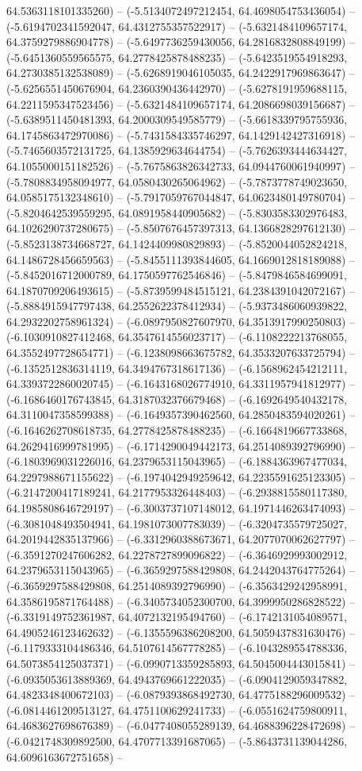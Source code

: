 64.5363118101335260) -- (-5.5134072497212454, 64.4698054753436054) -- (-5.6194702341592047, 64.4312755357522917) -- (-5.6321484109657174, 64.3759279886904778) -- (-5.6497736259430056, 64.2816832808849199) -- (-5.6451360559565575, 64.2778425878488235) -- (-5.6423519554918293, 64.2730385132538089) -- (-5.6268919046105035, 64.2422917969863647) -- (-5.6256551450676904, 64.2360390436442970) -- (-5.6278191959688115, 64.2211595347523456) -- (-5.6321484109657174, 64.2086698039156687) -- (-5.6389511450481393, 64.2000309549585779) -- (-5.6618339795755936, 64.1745863472970086) -- (-5.7431584335746297, 64.1429142427316918) -- (-5.7465603572131725, 64.1385929634644754) -- (-5.7626393444634427, 64.1055000151182526) -- (-5.7675863826342733, 64.0944760061940997) -- (-5.7808834958094977, 64.0580430265064962) -- (-5.7873778749023650, 64.0585175132348610) -- (-5.7917059767044847, 64.0623480149780704) -- (-5.8204642539559295, 64.0891958440905682) -- (-5.8303583302976483, 64.1026290737280675) -- (-5.8507676457397313, 64.1366828297612130) -- (-5.8523138734668727, 64.1424409980829893) -- (-5.8520044052824218, 64.1486728456659563) -- (-5.8455111393844605, 64.1669012818189088) -- (-5.8452016712000789, 64.1750597762546846) -- (-5.8479846584699091, 64.1870709206493615) -- (-5.8739599484515121, 64.2384391042072167) -- (-5.8884915947797438, 64.2552622378412934) -- (-5.9373486060939822, 64.2932202758961324) -- (-6.0897950827607970, 64.3513917990250803) -- (-6.1030910827412468, 64.3547614556023717) -- (-6.1108222213768055, 64.3552497728654771) -- (-6.1238098663675782, 64.3533207633725794) -- (-6.1352512836314119, 64.3494767318617136) -- (-6.1568962454212111, 64.3393722860020745) -- (-6.1643168026774910, 64.3311957941812977) -- (-6.1686460176743845, 64.3187032376679468) -- (-6.1692649540432178, 64.3110047358599388) -- (-6.1649357390462560, 64.2850483594020261) -- (-6.1646262708618735, 64.2778425878488235) -- (-6.1664819667733868, 64.2629416999781995) -- (-6.1714290049442173, 64.2514089392796990) -- (-6.1803969031226016, 64.2379653115043965) -- (-6.1884363967477034, 64.2297988671155622) -- (-6.1974042949259642, 64.2235591625123305) -- (-6.2147200417189241, 64.2177953326448403) -- (-6.2938815580117380, 64.1985808646729197) -- (-6.3003737107148012, 64.1971446263474093) -- (-6.3081048493504941, 64.1981073007783039) -- (-6.3204735579725027, 64.2019442835137966) -- (-6.3312960388673671, 64.2077070062627797) -- (-6.3591270247606282, 64.2278727899096822) -- (-6.3646929993002912, 64.2379653115043965) -- (-6.3659297588429808, 64.2442043764775264) -- (-6.3659297588429808, 64.2514089392796990) -- (-6.3563429242958991, 64.3586195871764488) -- (-6.3405734052300700, 64.3999950286828522) -- (-6.3319149752361987, 64.4072132195494760) -- (-6.1742131054089571, 64.4905246123462632) -- (-6.1355596386208200, 64.5059437831630476) -- (-6.1179333104486346, 64.5107614567778285) -- (-6.1043289554788336, 64.5073854125037371) -- (-6.0990713359285893, 64.5045004443015841) -- (-6.0935053613889369, 64.4943769661222035) -- (-6.0904129059347882, 64.4823348400672103) -- (-6.0879393868492730, 64.4775188296009532) -- (-6.0814461209513127, 64.4751100629241733) -- (-6.0551624759800911, 64.4683627698676389) -- (-6.0477408055289139, 64.4688396228472698) -- (-6.0421748309892500, 64.4707713391687065) -- (-5.8643731139044286, 64.6096163672751658) -- 